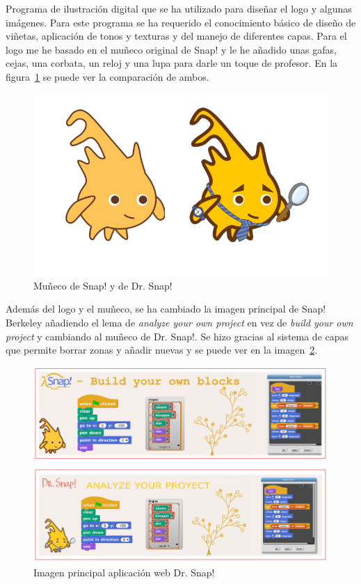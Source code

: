 \documentclass[a4paper, 12pt]{book}
\begin{document}
\begin{enumerate}[a)]
    Programa de ilustración digital que se ha utilizado para diseñar el logo y algunas imágenes. Para este programa se ha requerido el conocimiento básico de diseño de viñetas, aplicación de tonos y texturas y del manejo de diferentes capas. Para el logo me he basado en el muñeco original de Snap! y le he añadido unas gafas, cejas, una corbata, un reloj y una lupa para darle un toque de profesor. En la figura~\ref{figura:logos} se puede ver la comparación de ambos. 
    \\
        \begin{figure}[h]
            \centering
            \includegraphics[scale=0.4]{img/logos.png}
            \caption{Muñeco de Snap! y de Dr. Snap!}
            \label{figura:logos}
        \end{figure}
        
    Además del logo y el muñeco, se ha cambiado la imagen principal de Snap! Berkeley añadiendo el lema de \textit{analyze your own project} en vez de \textit{build your own project} y cambiando al muñeco de Dr. Snap!. Se hizo gracias al sistema de capas que permite borrar zonas y añadir nuevas y se puede ver en la imagen~\ref{figura:snap}.
    
    \begin{figure}[h]
            \centering
            \includegraphics[scale=0.35]{img/snap.PNG}
            \caption{Imagen principal aplicación web Dr. Snap!}
            \label{figura:snap}
        \end{figure}
        

\end{enumerate}
\end{document}

